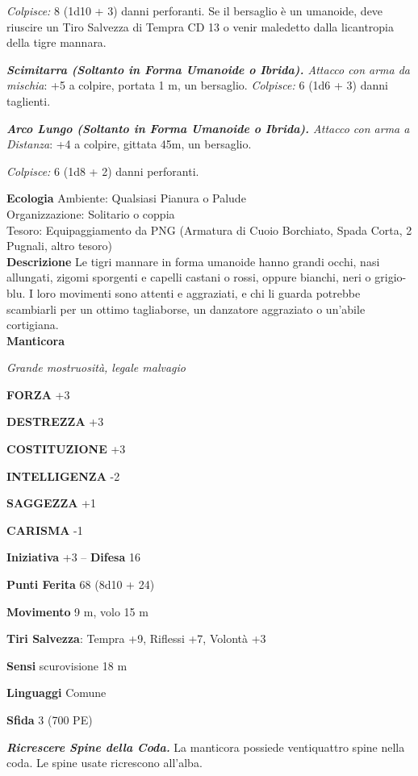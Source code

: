 \begin{multicols}{2}
\emph{Colpisce:} 8 (1d10 + 3) danni perforanti. Se il bersaglio è un umanoide, deve riuscire un Tiro Salvezza di Tempra CD 13 o venir maledetto dalla licantropia della tigre mannara.

\emph{\textbf{Scimitarra (Soltanto in Forma Umanoide o Ibrida).} Attacco con arma da mischia}: +5 a colpire, portata 1 m, un bersaglio. \emph{Colpisce:} 6 (1d6 + 3) danni taglienti.

\emph{\textbf{Arco Lungo (Soltanto in Forma Umanoide o Ibrida).} Attacco con arma a Distanza}: +4 a colpire, gittata 45m, un bersaglio.

\emph{Colpisce:} 6 (1d8 + 2) danni perforanti.

\textbf{Ecologia}
Ambiente: Qualsiasi Pianura o Palude\\
Organizzazione: Solitario o coppia\\
Tesoro: Equipaggiamento da PNG (Armatura di Cuoio Borchiato, Spada Corta, 2 Pugnali, altro tesoro)\\
\textbf{Descrizione}
Le tigri mannare in forma umanoide hanno grandi occhi, nasi allungati, zigomi sporgenti e capelli castani o rossi, oppure bianchi, neri o grigio-blu. I loro movimenti sono attenti e aggraziati, e chi li guarda potrebbe scambiarli per un ottimo tagliaborse, un danzatore aggraziato o un'abile cortigiana.\\


\medskip{}\textbf{Manticora}

\emph{Grande mostruosità, legale malvagio}

\textbf{FORZA} +3

\textbf{DESTREZZA} +3

\textbf{COSTITUZIONE} +3

\textbf{INTELLIGENZA} -2

\textbf{SAGGEZZA} +1

\textbf{CARISMA} -1

\textbf{Iniziativa} +3 -- \textbf{Difesa} 16

\textbf{Punti Ferita} 68 (8d10 + 24)

\textbf{Movimento} 9 m, volo 15 m

\textbf{Tiri Salvezza}: Tempra +9, Riflessi +7, Volontà +3

\textbf{Sensi} scurovisione 18 m

\textbf{Linguaggi} Comune

\textbf{Sfida} 3 (700 PE)

\emph{\textbf{Ricrescere Spine della Coda.}} La manticora possiede ventiquattro spine nella coda. Le spine usate ricrescono all'alba.


\end{multicols}
